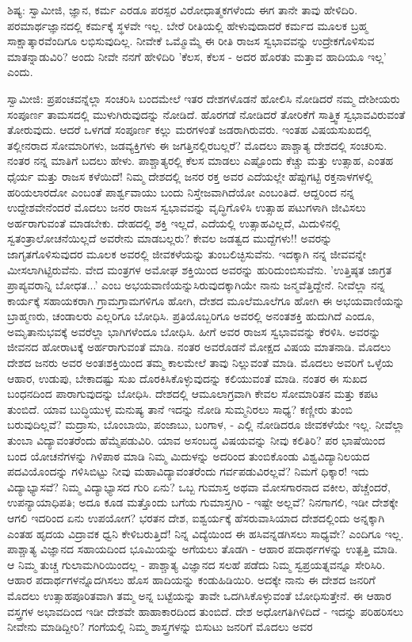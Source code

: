 ಶಿಷ್ಯ: ಸ್ವಾಮೀಜಿ, ಜ್ಞಾನ, ಕರ್ಮ ಎರಡೂ ಪರಸ್ಪರ ವಿರೋಧಾತ್ಮಕಗಳೆಂದು ಈಗ ತಾನೇ ತಾವು ಹೇಳಿದಿರಿ. ಪರಮಾರ್ಥಜ್ಞಾನದಲ್ಲಿ ಕರ್ಮಕ್ಕೆ ಸ್ಥಳವೇ ಇಲ್ಲ. ಬೇರೆ ರೀತಿಯಲ್ಲಿ ಹೇಳುವುದಾದರೆ ಕರ್ಮದ ಮೂಲಕ ಬ್ರಹ್ಮ ಸಾಕ್ಷಾತ್ಕಾರವೆಂದಿಗೂ ಲಭಿಸುವುದಿಲ್ಲ. ನೀವೇಕೆ ಒಮ್ಮೊಮ್ಮೆ ಈ ರೀತಿ ರಾಜಸ ಸ್ವಭಾವವನ್ನು ಉದ್ರೇಕಗೊಳಿಸುವ ಮಾತನ್ನಾಡುವಿರಿ? ಅಂದು ನೀವೇ ನನಗೆ ಹೇಳಿದಿರಿ 'ಕೆಲಸ, ಕೆಲಸ - ಅದರ ಹೊರತು ಮತ್ತಾವ ಹಾದಿಯೂ ಇಲ್ಲ' ಎಂದು.

ಸ್ವಾಮೀಜಿ: ಪ್ರಪಂಚವನ್ನೆಲ್ಲಾ ಸಂಚರಿಸಿ ಬಂದಮೇಲೆ ಇತರ ದೇಶಗಳೊಡನೆ ಹೋಲಿಸಿ ನೋಡಿದರೆ ನಮ್ಮ ದೇಶೀಯರು ಸಂಪೂರ್ಣ ತಾಮಸದಲ್ಲಿ ಮುಳುಗಿರುವುದನ್ನು ನೋಡಿದೆ. ಹೊರಗಡೆ ನೋಡಿದರೆ ತೋರಿಕೆಗೆ ಸಾತ್ತ್ವಿಕ ಸ್ವಭಾವವಿರುವಂತೆ ತೋರುವುದು. ಆದರೆ ಒಳಗಡೆ ಸಂಪೂರ್ಣ ಕಲ್ಲು ಮರಗಳಂತೆ ಜಡರಾಗಿರುವರು. ಇಂತಹ ವಿಷಯಸುಖದಲ್ಲಿ ತಲ್ಲೀನರಾದ ಸೋಮಾರಿಗಳು, ಜಡವ್ಯಕ್ತಿಗಳು ಈ ಜಗತ್ತಿನಲ್ಲಿರಬಲ್ಲರೆ? ಮೊದಲು ಪಾಶ್ಚಾತ್ಯ ದೇಶದಲ್ಲಿ ಸಂಚರಿಸು. ನಂತರ ನನ್ನ ಮಾತಿಗೆ ಬದಲು ಹೇಳು. ಪಾಶ್ಚಾತ್ಯರಲ್ಲಿ ಕೆಲಸ ಮಾಡಲು ಎಷ್ಟೊಂದು ಕೆಚ್ಚು ಮತ್ತು ಉತ್ಸಾಹ, ಎಂತಹ ಧೈರ್ಯ ಮತ್ತು ರಾಜಸ ಕಳೆಯಿದೆ! ನಿಮ್ಮ ದೇಶದಲ್ಲಿ ಜನರ ರಕ್ತ ಅವರ ಎದೆಯಲ್ಲೇ ಹೆಪ್ಪುಗಟ್ಟಿ ರಕ್ತನಾಳಗಳಲ್ಲಿ ಹರಿಯಲಾರದೋ ಎಂಬಂತೆ ಪಾರ್ಶ್ವವಾಯು ಬಂದು ನಿಸ್ತೇಜವಾಗಿದೆಯೋ ಎಂಬಂತಿದೆ. ಆದ್ದರಿಂದ ನನ್ನ ಉದ್ದೇಶವೇನೆಂದರೆ ಮೊದಲು ಜನರ ರಾಜಸ ಸ್ವಭಾವವನ್ನು ವೃದ್ಧಿಗೊಳಿಸಿ ಉತ್ಸಾಹ ಪಟುಗಳಾಗಿ ಜೀವಿಸಲು ಅರ್ಹರಾಗುವಂತೆ ಮಾಡಬೇಕು. ದೇಹದಲ್ಲಿ ಶಕ್ತಿ ಇಲ್ಲದೆ, ಎದೆಯಲ್ಲಿ ಉತ್ಸಾಹವಿಲ್ಲದೆ, ಮಿದುಳಿನಲ್ಲಿ ಸ್ವತಂತ್ರಾಲೋಚನೆಯಿಲ್ಲದೆ ಅವರೇನು ಮಾಡಬಲ್ಲರು? ಕೇವಲ ಜಡತ್ವದ ಮುದ್ದೆಗಳು!! ಅವರನ್ನು ಜಾಗೃತಗೊಳಿಸುವುದರ ಮೂಲಕ ಅವರಲ್ಲಿ ಜೀವಕಳೆಯನ್ನು ತುಂಬಲಿಚ್ಛಿಸುವೆನು. ಇದಕ್ಕಾಗಿ ನನ್ನ ಜೀವವನ್ನೇ ಮೀಸಲಾಗಿಟ್ಟಿರುವೆನು. ವೇದ ಮಂತ್ರಗಳ ಅಮೋಘ ಶಕ್ತಿಯಿಂದ ಅವರನ್ನು ಹುರಿದುಂಬಿಸುವೆನು. 'ಉತ್ತಿಷ್ಠತ ಜಾಗ್ರತ ಪ್ರಾಪ್ಯವರಾನ್ನಿ ಬೋಧತ...' ಎಂಬ ಅಭಯವಾಣಿಯನ್ನುಸಿರುವುದಕ್ಕಾಗಿಯೇ ನಾನು ಜನ್ಮವೆತ್ತಿದ್ದೇನೆ. ನೀವೆಲ್ಲಾ ನನ್ನ ಕಾರ್ಯಕ್ಕೆ ಸಹಾಯಕರಾಗಿ ಗ್ರಾಮಗ್ರಾಮಗಳಿಗೂ ಹೋಗಿ, ದೇಶದ ಮೂಲೆಮೂಲೆಗೂ ಹೋಗಿ ಈ ಅಭಯವಾಣಿಯನ್ನು ಬ್ರಾಹ್ಮಣರು, ಚಂಡಾಲರು ಎಲ್ಲರಿಗೂ ಬೋಧಿಸಿ. ಪ್ರತಿಯೊಬ್ಬರಿಗೂ ಅವರಲ್ಲಿ ಅನಂತಶಕ್ತಿ ಹುದುಗಿದೆ ಎಂದೂ, ಅಮೃತಾನುಭವಕ್ಕೆ ಅವರೆಲ್ಲಾ ಭಾಗಿಗಳೆಂದೂ ಬೋಧಿಸಿ. ಹೀಗೆ ಅವರ ರಾಜಸ ಸ್ವಭಾವವನ್ನು ಕೆರಳಿಸಿ. ಅವರನ್ನು ಜೀವನದ ಹೋರಾಟಕ್ಕೆ ಅರ್ಹರಾಗುವಂತೆ ಮಾಡಿ. ನಂತರ ಅವರೊಡನೆ ಮೋಕ್ಷದ ವಿಷಯ ಮಾತನಾಡಿ. ಮೊದಲು ದೇಶದ ಜನರು ಅವರ ಅಂತಃಶಕ್ತಿಯಿಂದ ತಮ್ಮ ಕಾಲಮೇಲೆ ತಾವು ನಿಲ್ಲುವಂತೆ ಮಾಡಿ. ಮೊದಲು ಅವರಿಗೆ ಒಳ್ಳೆಯ ಆಹಾರ, ಉಡುಪು, ಬೇಕಾದಷ್ಟು ಸುಖ ದೊರಕಿಸಿಕೊಳ್ಳುವುದನ್ನು ಕಲಿಯುವಂತೆ ಮಾಡಿ. ನಂತರ ಈ ಸುಖದ ಬಂಧನದಿಂದ ಪಾರಾಗುವುದನ್ನು ಬೋಧಿಸಿ. ದೇಶದಲ್ಲಿ ಆಮೂಲಾಗ್ರವಾಗಿ ಕೇವಲ ಸೋಮಾರಿತನ ಮತ್ತು ಕಪಟ ತುಂಬಿದೆ. ಯಾವ ಬುದ್ಧಿಯುಳ್ಳ ಮನುಷ್ಯ ತಾನೆ ಇದನ್ನು ನೋಡಿ ಸುಮ್ಮನಿರಲು ಸಾಧ್ಯ? ಕಣ್ಣೀರು ತುಂಬಿ ಬರುವುದಿಲ್ಲವೆ? ಮದ್ರಾಸು, ಬೊಂಬಾಯಿ, ಪಂಜಾಬು, ಬಂಗಾಳ, - ಎಲ್ಲಿ ನೋಡಿದರೂ ಜೀವಕಳೆಯೇ ಇಲ್ಲ. ನೀವೆಲ್ಲಾ ತುಂಬಾ ವಿದ್ಯಾವಂತರೆಂದು ಹೆಮ್ಮೆಪಡುವಿರಿ. ಯಾವ ಅಸಂಬದ್ಧ ವಿಷಯವನ್ನು ನೀವು ಕಲಿತಿರಿ? ಪರ ಭಾಷೆಯಿಂದ ಬಂದ ಯೋಚನೆಗಳನ್ನು ಗಿಳಿಪಾಠ ಮಾಡಿ ನಿಮ್ಮ ಮಿದುಳನ್ನು ಅದರಿಂದ ತುಂಬಿಕೊಂಡು ವಿಶ್ವವಿದ್ಯಾನಿಲಯದ ಪದವಿಯೊಂದನ್ನು ಗಳಿಸಿಬಿಟ್ಟು ನೀವು ಮಹಾವಿದ್ಯಾವಂತರೆಂದು ಗರ್ವಪಡುವಿರಲ್ಲವೆ? ನಿಮಗೆ ಧಿಕ್ಕಾರ! ಇದು ವಿದ್ಯಾಭ್ಯಾಸವೆ? ನಿಮ್ಮ ವಿದ್ಯಾಭ್ಯಾಸದ ಗುರಿ ಏನು? ಒಬ್ಬ ಗುಮಾಸ್ತ ಅಥವಾ ಮೋಸಗಾರನಾದ ವಕೀಲ, ಹೆಚ್ಚೆಂದರೆ, ಉಪನ್ಯಾಯಾಧಿಪತಿ; ಅದೂ ಕೂಡ ಮತ್ತೊಂದು ಬಗೆಯ ಗುಮಾಸ್ತಗಿರಿ - ಇಷ್ಟೇ ಅಲ್ಲವೆ? ನಿನಗಾಗಲಿ, ಇಡೀ ದೇಶಕ್ಕೇ ಆಗಲಿ ಇದರಿಂದ ಏನು ಉಪಯೋಗ? ಭರತನ ದೇಶ, ಐಶ್ವರ್ಯಕ್ಕೆ ಹೆಸರುವಾಸಿಯಾದ ದೇಶದಲ್ಲಿಂದು ಅನ್ನಕ್ಕಾಗಿ ಎಂತಹ ಹೃದಯ ವಿದ್ರಾವಕ ಧ್ವನಿ ಕೇಳಿಬರುತ್ತಿದೆ! ನಿನ್ನ ವಿದ್ಯೆಯಿಂದ ಈ ಹಸಿವನ್ನಡಗಿಸಲು ಸಾಧ್ಯವೇ? ಎಂದಿಗೂ ಇಲ್ಲ. ಪಾಶ್ಚಾತ್ಯ ವಿಜ್ಞಾನದ ಸಹಾಯದಿಂದ ಭೂಮಿಯನ್ನು ಅಗೆಯಲು ತೊಡಗಿ - ಆಹಾರ ಪದಾರ್ಥಗಳನ್ನು ಉತ್ಪತ್ತಿ ಮಾಡಿ. ಆ ನಿಮ್ಮ ತುಚ್ಚ ಗುಲಾಮಗಿರಿಯಿಂದಲ್ಲ - ಪಾಶ್ಚಾತ್ಯ ವಿಜ್ಞಾನದ ಸಲಹೆ ಪಡೆದು ನಿಮ್ಮ ಸ್ವಪ್ರಯತ್ನವನ್ನೂ ಸೇರಿಸಿರಿ. ಆಹಾರ ಪದಾರ್ಥಗಳನ್ನೊದಗಿಸಲು ಹೊಸ ಹಾದಿಯನ್ನು ಕಂಡುಹಿಡಿಯಿರಿ. ಅದಕ್ಕೇ ನಾನು ಈ ದೇಶದ ಜನರಿಗೆ ಮೊದಲು ಉತ್ಸಾಹಪೂರಿತವಾಗಿ ತಮ್ಮ ಅನ್ನ ಬಟ್ಟೆಯನ್ನು ತಾವೇ ಒದಗಿಸಿಕೊಳ್ಳುವಂತೆ ಬೋಧಿಸುತ್ತೇನೆ. ಈ ಆಹಾರ ವಸ್ತ್ರಗಳ ಅಭಾವದಿಂದ ಇಡೀ ದೇಶವೇ ಹಾಹಾಕಾರದಿಂದ ತುಂಬಿದೆ. ದೇಶ ಅಧೋಗತಿಗಿಳಿದಿದೆ - ಇದನ್ನು ಪರಿಹರಿಸಲು ನೀವೇನು ಮಾಡಿದ್ದೀರಿ? ಗಂಗೆಯಲ್ಲಿ ನಿಮ್ಮ ಶಾಸ್ತ್ರಗಳನ್ನು ಬಿಸುಟು ಜನರಿಗೆ ಮೊದಲು ಅವರ 